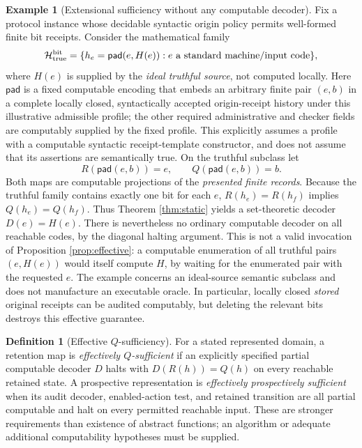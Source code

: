 \documentclass[11pt,letterpaper]{article}
\theoremstyle{definition}
\newtheorem{definition}[theorem]{Definition}
\newtheorem{example}[theorem]{Example}
\newcommand{\Hh}{\mathcal H}
\begin{document}
\begin{example}[Extensional sufficiency without any computable decoder]\label{ex:truth-obstruction}
Fix a protocol instance whose decidable syntactic origin policy permits well-formed finite bit receipts. Consider the mathematical family
\[
\Hh_{\rm true}^{\rm bit}=\{h_e=\mathsf{pad}(e,H(e)):e\text{ a standard machine/input code}\},
\]
where $H(e)$ is supplied by the \emph{ideal truthful source}, not computed locally. Here $\mathsf{pad}$ is a fixed computable encoding that embeds an arbitrary finite pair $(e,b)$ in a complete locally closed, syntactically accepted origin-receipt history under this illustrative admissible profile; the other required administrative and checker fields are computably supplied by the fixed profile. This explicitly assumes a profile with a computable syntactic receipt-template constructor, and does not assume that its assertions are semantically true. On the truthful subclass let
\[
R(\mathsf{pad}(e,b))=e,\qquad Q(\mathsf{pad}(e,b))=b.
\]
Both maps are computable projections of the \emph{presented finite records}. Because the truthful family contains exactly one bit for each $e$, $R(h_e)=R(h_f)$ implies $Q(h_e)=Q(h_f)$. Thus Theorem \ref{thm:static} yields a set-theoretic decoder $D(e)=H(e)$. There is nevertheless no ordinary computable decoder on all reachable codes, by the diagonal halting argument. This is not a valid invocation of Proposition \ref{prop:effective}: a computable enumeration of all truthful pairs $(e,H(e))$ would itself compute $H$, by waiting for the enumerated pair with the requested $e$. The example concerns an ideal-source semantic subclass and does not manufacture an executable oracle. In particular, locally closed \emph{stored} original receipts can be audited computably, but deleting the relevant bits destroys this effective guarantee.
\end{example}

\begin{definition}[Effective $Q$-sufficiency]\label{def:effective}
For a stated represented domain, a retention map is \emph{effectively $Q$-sufficient} if an explicitly specified partial computable decoder $D$ halts with $D(R(h))=Q(h)$ on every reachable retained state. A prospective representation is \emph{effectively prospectively sufficient} when its audit decoder, enabled-action test, and retained transition are all partial computable and halt on every permitted reachable input. These are stronger requirements than existence of abstract functions; an algorithm or adequate additional computability hypotheses must be supplied.
\end{definition}
\end{document}
